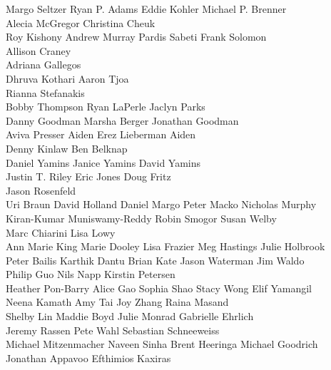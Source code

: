 \begin{spacing}{2}
\begin{center}
Margo Seltzer \quad Ryan P. Adams \quad Eddie Kohler \quad Michael P. Brenner \\
Alecia McGregor \quad Christina Cheuk \\
Roy Kishony \quad Andrew Murray \quad Pardis Sabeti \quad Frank Solomon \\
Allison Craney \\
Adriana Gallegos \\
Dhruva Kothari \quad Aaron Tjoa \\
Rianna Stefanakis \\
Bobby Thompson \quad Ryan LaPerle \quad Jaclyn Parks \\
Danny Goodman \quad Marsha Berger \quad Jonathan Goodman \\
Aviva Presser Aiden \quad Erez Lieberman Aiden \\
Denny Kinlaw \quad Ben Belknap \\
Daniel Yamins \quad Janice Yamins \quad David Yamins \\
Justin T. Riley \quad Eric Jones \quad Doug Fritz \\
Jason Rosenfeld \\
Uri Braun \quad David Holland \quad Daniel Margo \quad Peter Macko \quad Nicholas Murphy \\
Kiran-Kumar Muniswamy-Reddy \quad Robin Smogor \quad Susan Welby \\
Marc Chiarini \quad Lisa Lowy \\
Ann Marie King \quad Marie Dooley \quad Lisa Frazier \quad Meg Hastings \quad Julie Holbrook \\
Peter Bailis \quad Karthik Dantu \quad Brian Kate \quad Jason Waterman \quad Jim Waldo \\
Philip Guo \quad Nils Napp \quad Kirstin Petersen \\
Heather Pon-Barry \quad Alice Gao \quad Sophia Shao \quad \quad Stacy Wong \quad Elif Yamangil \\
Neena Kamath \quad Amy Tai \quad Joy Zhang \quad Raina Masand \\
Shelby Lin \quad Maddie Boyd \quad Julie Monrad \quad Gabrielle Ehrlich \\ 
Jeremy Rassen \quad Pete Wahl \quad Sebastian Schneeweiss \\
Michael Mitzenmacher \quad Naveen Sinha \quad Brent Heeringa \quad  Michael Goodrich \\
Jonathan Appavoo \quad Efthimios Kaxiras \\

\end{center}
\end{spacing}
